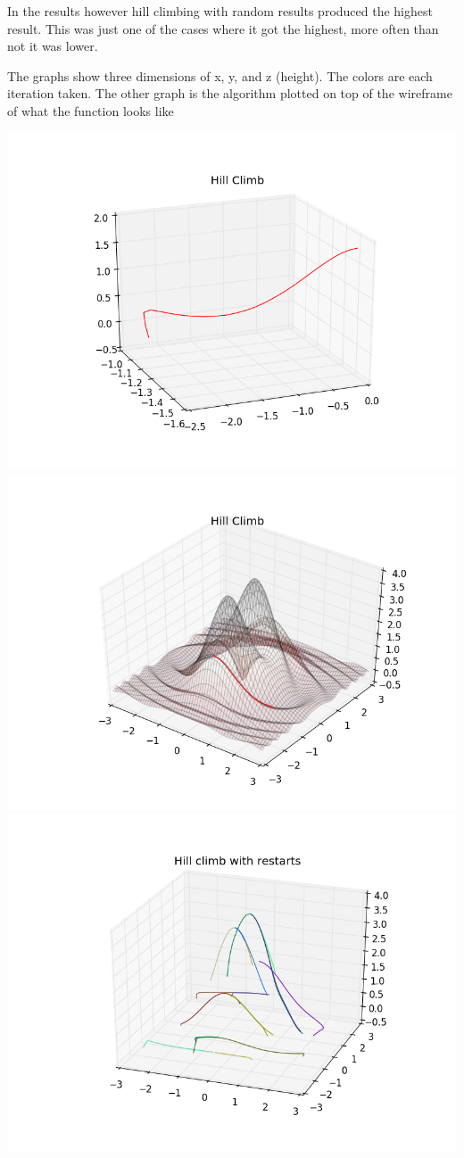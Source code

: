 \documentclass[letter,12pt]{article}
\begin{document}
In the results however hill climbing with random results produced the highest result. This was just one of the cases where it got the highest, more often than not it was lower.

The graphs show three dimensions of x, y, and z (height). The colors are each iteration taken. The other graph is the algorithm plotted on top of the wireframe of what the function looks like

\includegraphics[scale=0.35]{hill_climb}
\includegraphics[scale=0.35]{hill_climb_graph}
\includegraphics[scale=0.35]{hill_climb_random}
\end{document}
